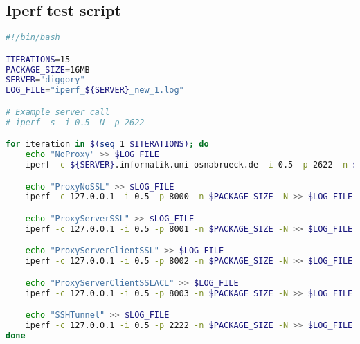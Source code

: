 \subsection{Iperf test script}
\begin{lstlisting}[frame=single, language=bash, caption={Iperf test script},label=code::iperf]
#!/bin/bash

ITERATIONS=15
PACKAGE_SIZE=16MB
SERVER="diggory"
LOG_FILE="iperf_${SERVER}_new_1.log"

# Example server call
# iperf -s -i 0.5 -N -p 2622

for iteration in $(seq 1 $ITERATIONS); do
    echo "NoProxy" >> $LOG_FILE
    iperf -c ${SERVER}.informatik.uni-osnabrueck.de -i 0.5 -p 2622 -n $PACKAGE_SIZE -N >> $LOG_FILE

    echo "ProxyNoSSL" >> $LOG_FILE
    iperf -c 127.0.0.1 -i 0.5 -p 8000 -n $PACKAGE_SIZE -N >> $LOG_FILE

    echo "ProxyServerSSL" >> $LOG_FILE
    iperf -c 127.0.0.1 -i 0.5 -p 8001 -n $PACKAGE_SIZE -N >> $LOG_FILE

    echo "ProxyServerClientSSL" >> $LOG_FILE
    iperf -c 127.0.0.1 -i 0.5 -p 8002 -n $PACKAGE_SIZE -N >> $LOG_FILE

    echo "ProxyServerClientSSLACL" >> $LOG_FILE
    iperf -c 127.0.0.1 -i 0.5 -p 8003 -n $PACKAGE_SIZE -N >> $LOG_FILE

    echo "SSHTunnel" >> $LOG_FILE
    iperf -c 127.0.0.1 -i 0.5 -p 2222 -n $PACKAGE_SIZE -N >> $LOG_FILE
done
\end{lstlisting}